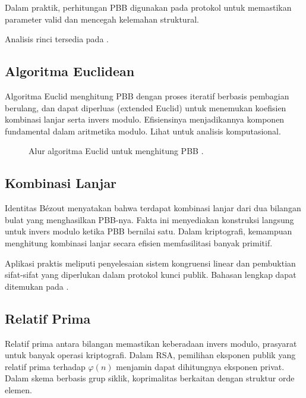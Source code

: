 \documentclass[../main.tex]{subfiles}
\begin{document}
Dalam praktik, perhitungan PBB digunakan pada protokol untuk memastikan parameter valid dan mencegah kelemahan struktural.

Analisis rinci tersedia pada \textcite{menezes1996handbook}.

\subsection{Algoritma Euclidean}
Algoritma Euclid menghitung PBB dengan proses iteratif berbasis pembagian berulang, dan dapat diperluas (extended Euclid) untuk menemukan koefisien kombinasi lanjar serta invers modulo. Efisiensinya menjadikannya komponen fundamental dalam aritmetika modulo. Lihat \textcite{shoup2009number} untuk analisis komputasional.

\begin{figure}[h]
\centering
{}
\caption{Alur algoritma Euclid untuk menghitung PBB \parencite{shoup2009number}.}
\label{fig:euclid-flow}
\end{figure}

\subsection{Kombinasi Lanjar}
Identitas Bézout menyatakan bahwa terdapat kombinasi lanjar dari dua bilangan bulat yang menghasilkan PBB-nya. Fakta ini menyediakan konstruksi langsung untuk invers modulo ketika PBB bernilai satu. Dalam kriptografi, kemampuan menghitung kombinasi lanjar secara efisien memfasilitasi banyak primitif.

Aplikasi praktis meliputi penyelesaian sistem kongruensi linear dan pembuktian sifat-sifat yang diperlukan dalam protokol kunci publik. Bahasan lengkap dapat ditemukan pada \textcite{menezes1996handbook}.

\subsection{Relatif Prima}
Relatif prima antara bilangan memastikan keberadaan invers modulo, prasyarat untuk banyak operasi kriptografi. Dalam RSA, pemilihan eksponen publik yang relatif prima terhadap \(\varphi(n)\) menjamin dapat dihitungnya eksponen privat. Dalam skema berbasis grup siklik, koprimalitas berkaitan dengan struktur orde elemen.
\end{document}
